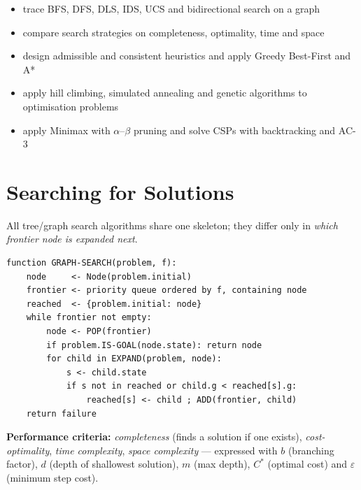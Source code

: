 
\begin{outcome}
\begin{itemize}
\item trace BFS, DFS, DLS, IDS, UCS and bidirectional search on a graph 
\item compare search strategies on completeness, optimality, time and space 
\item design admissible and consistent heuristics and apply Greedy Best-First and A* 
\item apply hill climbing, simulated annealing and genetic algorithms to optimisation problems 
\item apply Minimax with $\alpha$--$\beta$ pruning and solve CSPs with backtracking and AC-3 
\end{itemize}
\end{outcome}

\section{Searching for Solutions}
All tree/graph search algorithms share one skeleton; they differ only in \emph{which frontier node is expanded next}.
\begin{algo}
\begin{lstlisting}[numbers=none,backgroundcolor=\color{ivory},frame=none]
function GRAPH-SEARCH(problem, f):
    node     <- Node(problem.initial)
    frontier <- priority queue ordered by f, containing node
    reached  <- {problem.initial: node}
    while frontier not empty:
        node <- POP(frontier)
        if problem.IS-GOAL(node.state): return node
        for child in EXPAND(problem, node):
            s <- child.state
            if s not in reached or child.g < reached[s].g:
                reached[s] <- child ; ADD(frontier, child)
    return failure
\end{lstlisting}
\end{algo}
\textbf{Performance criteria:} \emph{completeness} (finds a solution if one exists), \emph{cost-optimality}, \emph{time complexity}, \emph{space complexity} --- expressed with $b$ (branching factor), $d$ (depth of shallowest solution), $m$ (max depth), $C^{*}$ (optimal cost) and $\varepsilon$ (minimum step cost).


